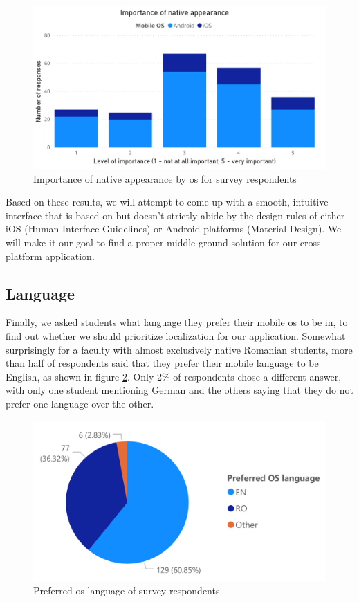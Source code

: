 \begin{figure}[ht]
    \centering
         \includegraphics[width=\textwidth]{figures/charts/survey/native_appearance.pdf}
    \caption{Importance of native appearance by \acrshort{os} for survey respondents}
    \label{3:fig:native_appearance}
\end{figure}

Based on these results, we will attempt to come up with a smooth, intuitive interface that is based on but doesn't strictly abide by the design rules of either iOS (Human Interface Guidelines\cite{apple2020human}) or Android platforms (Material Design\cite{google2020material}). We will make it our goal to find a proper middle-ground solution for our cross-platform application.

\subsection{Language} \label{3:language}

Finally, we asked students what language they prefer their mobile \acrshort{os} to be in, to find out whether we should prioritize localization for our application. Somewhat surprisingly for a faculty with almost exclusively native Romanian students, more than half of respondents said that they prefer their mobile language to be English, as shown in figure \ref{3:fig:language}. Only 2\% of respondents chose a different answer, with only one student mentioning German and the others saying that they do not prefer one language over the other.

\begin{figure}[ht]
    \centering
         \includegraphics[height=0.2\textheight]{figures/charts/survey/language.pdf}
    \caption{Preferred \acrshort{os} language of survey respondents}
    \label{3:fig:language}
\end{figure}

